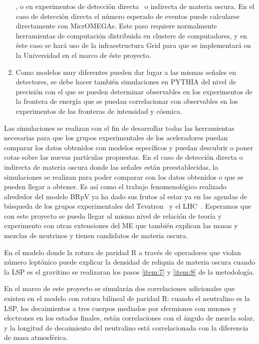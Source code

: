 \begin{enumerate}
  \cite{Magro:2003zb,deCampos:2005ri,deCampos:2007bn,deCampos:2008ic,deCampos:2008re},
  o en experimentos de detección directa~\cite{Bernal:2009tt,Bernal:2009jc} o indirecta \cite{Choi:2010xn} de
  materia oscura. En el caso de detección directa el número esperado
  de eventos puede calcularse directamente con MicrOMEGAs. Este paso
  requiere normalmente herramientas de computación distribuida en
  clusters de computadores, y en éste caso se hará uso de la
  infraestructura Grid para que se implementará en la Universidad en
  el marco de éste proyecto.
  \label{item:8}
\item Como modelos muy diferentes pueden dar lugar a las mismas
  señales en detectores, se debe hacer también simulaciones en PYTHIA
  del nivel de precisión con el que se pueden determinar observables
  en los experimentos de la frontera de energía que se puedan
  correlacionar con observables en los experimentos de las fronteras
  de intensidad y cósmica.
  \label{item:9}
\end{enumerate}

Las simulaciones se realizan con el fin de desarrollar todas las
herramientas necesarias para que los grupos experimentales de los
aceleradores puedan comparar los datos obtenidos con modelos
específicos y puedan descubrir o poner cotas sobre las nuevas
partículas propuestas. En el caso de detección directa o indirecta de
materia oscura donde las señales están preestablecidas, la
simulaciones se realizan para poder comparar con los datos obtenidos o
que se pueden llegar a obtener. Es así como el trabajo fenomenológico
realizado alrededor del modelo BRpV ya ha dado sus frutos al estar ya
en las agendas de búsqueda de los grupos experimentales del
Tevatron~\cite{Brigliadori:2008vf} y el LHC~\cite{:2011iu}. Esperamos
que con este proyecto se pueda llegar al mismo nivel de relación de
teoría y experimento con otras extensiones del ME que
también explican las masas y mezclas de neutrinos y tienen candidatos
de materia oscura.



\begin{gravitinodm}
  En el modelo donde la rotura de paridad R a través de operadores
  que violan número leptónico puede explicar la densidad de reliquia
  de materia oscura cuando la LSP es el gravitino se realizaran los
  pasos \ref{item:7} y \ref{item:8} de la metodología.
\end{gravitinodm}

\begin{brpvlhc}
  En el marco de este proyecto se simularán dos correlaciones
  adicionales que existen en el modelo con rotura bilineal de paridad R:
  cuando el neutralino es la LSP, los decaimientos a tres cuerpos
  mediados por sfermiones con muones y electrones en los estados
  finales, están correlaciones con el ángulo de mezcla solar, y la
  longitud de decaimiento del neutralino está correlacionada con la
  diferencia de masa atmosférica.
\end{brpvlhc}

